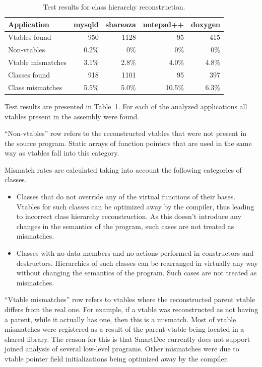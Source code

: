\documentclass[10pt, conference, compsocconf]{IEEEtran}
\newcommand{\compact}{}
\newcommand{\skipspace}{}
\begin{document}
\begin{table}[b!]
\footnotesize
\begin{tabular}{| l | r | r | r | r |}
\hline
Application &          mysqld & shareaza & notepad++ & doxygen \\
\hline
Vtables found &         950   &   1128   &   95      & 415 \\
Non-vtables &           0.2\% &   0\%    &   0\%     & 0\% \\
Vtable mismatches &     3.1\% &    2.8\% & 4.0\%     & 4.8\% \\
Classes found &         918   &   1101   &  95       & 397 \\
Class mismatches &      5.5\% &    5.0\% & 10.5\%    & 6.3\% \\
\hline
\end{tabular}
\caption{Test results for class hierarchy reconstruction.}
\label{table:tests}
\end{table}

Test results are presented in Table~\ref{table:tests}.
For each of the analyzed applications all vtables present in
the assembly were found.

``Non-vtables'' row refers to the reconstructed vtables that were not present
in the source program. Static arrays of function pointers that are
used in the same way as vtables fall into this category.

Mismatch rates are calculated taking into account the following categories of classes.
\skipspace\begin{itemize}\compact
\item Classes that do not override any of the virtual functions of
    their bases. Vtables for such classes can be optimized away by
    the compiler, thus leading to incorrect class hierarchy reconstruction. 
	As this doesn't introduce any changes in the semantics of
    the program, such cases are not treated as mismatches.
\item Classes with no data members and no actions performed in
    constructors and destructors. Hierarchies of such classes can be
    rearranged in virtually any way without changing the semantics
    of the program. Such cases are not treated as mismatches.
\end{itemize}

``Vtable mismatches'' row refers to vtables where the reconstructed parent vtable
differs from the real one. For example, if a vtable was reconstructed
as not having a parent, while it actually has one, then this is a mismatch.
Most of vtable mismatches were registered as a result of the parent vtable
being located in a shared library. The reason for this is that SmartDec 
currently does not support joined analysis of several low-level programs.
Other mismatches were due to vtable pointer field 
initializations being optimized away by the compiler.
\end{document}
